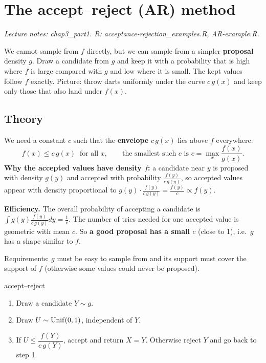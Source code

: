 \section{The accept--reject (AR) method}
\textit{Lecture notes: chap3\_part1. R: acceptance-rejection\_examples.R, AR-example.R.}

\begin{idea}
We cannot sample from $f$ directly, but we can sample from a simpler \textbf{proposal} density $g$. Draw a candidate from $g$ and keep it with a probability that is high where $f$ is large compared with $g$ and low where it is small. The kept values follow $f$ exactly. Picture: throw darts uniformly under the curve $c\,g(x)$ and keep only those that also land under $f(x)$.
\end{idea}

\subsection{Theory}
We need a constant $c$ such that the \textbf{envelope} $c\,g(x)$ lies above $f$ everywhere:
\[
f(x) \le c\,g(x)\ \text{ for all } x, \qquad\text{the smallest such } c \text{ is } c = \max_x \frac{f(x)}{g(x)} .
\]
\textbf{Why the accepted values have density $f$:} a candidate near $y$ is proposed with density $g(y)$ and accepted with probability $\frac{f(y)}{c\,g(y)}$, so accepted values appear with density proportional to $g(y)\cdot\frac{f(y)}{c\,g(y)} = \frac{f(y)}{c} \propto f(y)$.

\textbf{Efficiency.} The overall probability of accepting a candidate is $\int g(y)\frac{f(y)}{c\,g(y)}dy = \frac1c$. The number of tries needed for one accepted value is geometric with mean $c$. So \textbf{a good proposal has a small $c$} (close to 1), i.e.\ $g$ has a shape similar to $f$.

Requirements: $g$ must be easy to sample from and its support must cover the support of $f$ (otherwise some values could never be proposed).

\begin{algo}{accept--reject}
\begin{enumerate}
  \item Draw a candidate $Y \sim g$.
  \item Draw $U \sim\mathrm{Unif}(0,1)$, independent of $Y$.
  \item If $U \le \dfrac{f(Y)}{c\,g(Y)}$, accept and return $X = Y$. Otherwise reject $Y$ and go back to step 1.
\end{enumerate}
\end{algo}

